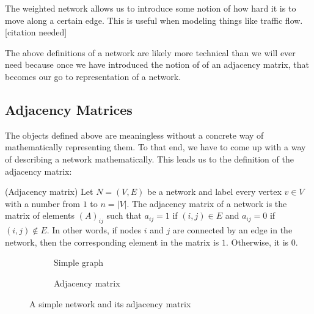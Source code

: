 The weighted network allows us to introduce some notion of how hard it is to move along a certain edge. This is useful when modeling things like traffic flow. [citation needed]

The above definitions of a network are likely more technical than we will ever need because once we have introduced the notion of of an adjacency matrix, that becomes our go to representation of a network.

\subsection{Adjacency Matrices}
The objects defined above are meaningless without a concrete way of mathematically representing them. To that end, we have to come up with a way of describing a network mathematically. This leads us to the definition of the adjacency matrix:

\begin{definition}{(Adjacency matrix)}
    Let $N = (V, E)$ be a network and label every vertex $v \in V$ with a number from $1$ to $n = |V|$. The adjacency matrix of a network is the matrix of elements $(A)_{ij}$ such that $a_{ij} = 1$ if $(i, j) \in E$ and $a_{ij} = 0$ if $(i, j) \notin E$. In other words, if nodes $i$ and $j$ are connected by an edge in the network, then the corresponding element in the matrix is $1$. Otherwise, it is $0$.\label{def:adjacency_matrix}
\end{definition}

\begin{figure}
    \begin{center}
        \begin{subfigure}[b]{0.45\textwidth}
            \caption{Simple graph}
            \label{fig:simple_network}
        \end{subfigure}
        \begin{subfigure}[b]{0.45\textwidth}
            \caption{Adjacency matrix}
            \label{fig:simple_network_adjacency_matrix}
        \end{subfigure}
    \end{center}
    \caption{A simple network and its adjacency matrix}
    \label{fig:simple_network_and_adjacency_matrix}
\end{figure}

